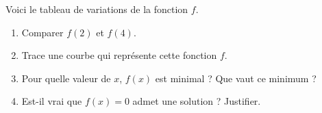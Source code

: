 

Voici le tableau de variations de la fonction $f$.

\begin{enumerate}
\item Comparer $f(2)$ et $f(4)$.
\item Trace une courbe qui représente cette fonction $f$.
\item Pour quelle valeur de $x$, $f(x)$ est minimal ? Que vaut ce minimum ?
\item Est-il vrai que $f(x)=0$ admet une solution ? Justifier.
\end{enumerate}